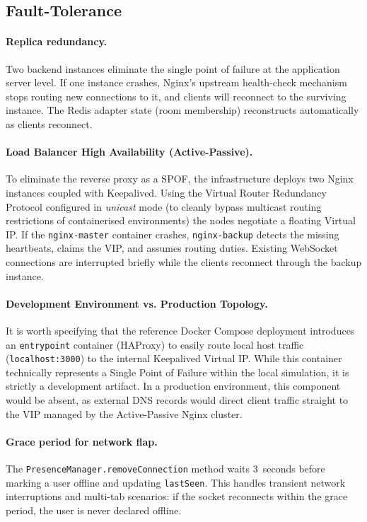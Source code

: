 \documentclass{scrartcl}
\begin{document}
  \subsection{Fault-Tolerance}\label{fault-tolerance}

  \paragraph{Replica redundancy.}
  Two backend instances eliminate the single point of failure at the application server level.
  If one instance crashes, Nginx's upstream health-check mechanism stops routing new
  connections to it, and clients will reconnect to the surviving instance. The Redis adapter
  state (room membership) reconstructs automatically as clients reconnect.

  \paragraph{Load Balancer High Availability (Active-Passive).}
  To eliminate the reverse proxy as a SPOF, the infrastructure deploys two Nginx instances coupled with Keepalived.
  Using the Virtual Router Redundancy Protocol configured in \emph{unicast} mode
  (to cleanly bypass multicast routing restrictions of containerised environments) the nodes negotiate a floating Virtual IP.
  If the \texttt{nginx-master} container crashes, \texttt{nginx-backup} detects the missing heartbeats, claims the VIP,
  and assumes routing duties. Existing WebSocket connections are interrupted briefly while
  the clients reconnect through the backup instance.

  \paragraph{Development Environment vs. Production Topology.}
  It is worth specifying that the reference Docker Compose deployment introduces an \texttt{entrypoint} container (HAProxy)
  to easily route local host traffic (\texttt{localhost:3000}) to the internal Keepalived Virtual IP.
  While this container technically represents a Single Point of Failure within the local simulation, it is strictly a development artifact.
  In a production environment, this component would be absent, as external DNS records would direct client traffic
  straight to the VIP managed by the Active-Passive Nginx cluster.

  \paragraph{Grace period for network flap.}
  The \texttt{PresenceManager.removeConnection} method waits 3~seconds before marking a user
  offline and updating \texttt{lastSeen}. This handles transient network interruptions and
  multi-tab scenarios: if the socket reconnects within the grace period, the user is never
  declared offline.
\end{document}
